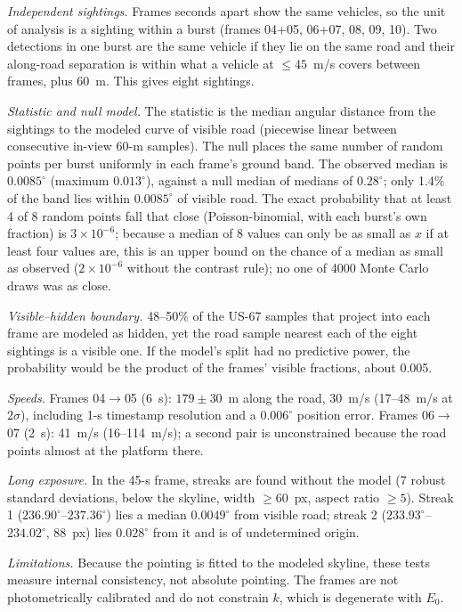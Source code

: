 \documentclass[11pt]{article}
\begin{document}
\textit{Independent sightings.} Frames seconds apart show the same vehicles, so the unit of analysis is a sighting within a burst (frames 04+05, 06+07, 08, 09, 10). Two detections in one burst are the same vehicle if they lie on the same road and their along-road separation is within what a vehicle at $\le45$~m/s covers between frames, plus 60~m. This gives eight sightings.

\textit{Statistic and null model.} The statistic is the median angular distance from the sightings to the modeled curve of visible road (piecewise linear between consecutive in-view 60-m samples). The null places the same number of random points per burst uniformly in each frame's ground band. The observed median is $0.0085^\circ$ (maximum $0.013^\circ$), against a null median of medians of $0.28^\circ$; only 1.4\% of the band lies within $0.0085^\circ$ of visible road. The exact probability that at least 4 of 8 random points fall that close (Poisson-binomial, with each burst's own fraction) is $3\times10^{-6}$; because a median of 8 values can only be as small as $x$ if at least four values are, this is an upper bound on the chance of a median as small as observed ($2\times10^{-6}$ without the contrast rule); no one of 4000 Monte Carlo draws was as close.

\textit{Visible--hidden boundary.} 48--50\% of the US-67 samples that project into each frame are modeled as hidden, yet the road sample nearest each of the eight sightings is a visible one. If the model's split had no predictive power, the probability would be the product of the frames' visible fractions, about 0.005.

\textit{Speeds.} Frames 04$\to$05 (6~s): $179\pm30$~m along the road, 30~m/s (17--48~m/s at $2\sigma$), including 1-s timestamp resolution and a $0.006^\circ$ position error. Frames 06$\to$07 (2~s): 41~m/s (16--114~m/s); a second pair is unconstrained because the road points almost at the platform there.

\textit{Long exposure.} In the 45-s frame, streaks are found without the model (7 robust standard deviations, below the skyline, width $\ge60$~px, aspect ratio $\ge5$). Streak 1 ($236.90^\circ$--$237.36^\circ$) lies a median $0.0049^\circ$ from visible road; streak 2 ($233.93^\circ$--$234.02^\circ$, 88~px) lies $0.028^\circ$ from it and is of undetermined origin.

\textit{Limitations.} Because the pointing is fitted to the modeled skyline, these tests measure internal consistency, not absolute pointing. The frames are not photometrically calibrated and do not constrain $k$, which is degenerate with $E_0$.
\end{document}

